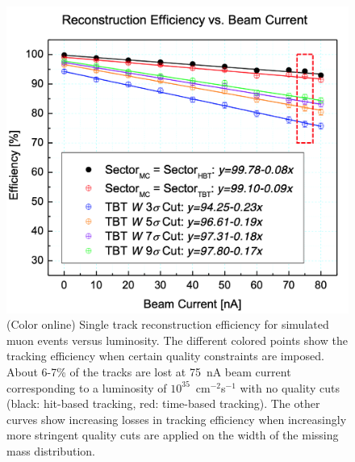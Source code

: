 \documentclass[final,3p,twocolumn]{elsarticle}
\begin{document}
\begin{figure}[htbp!]
\centerline{\includegraphics[width=1.0\columnwidth]{efficiencies.png}}
\caption{(Color online) Single track reconstruction efficiency for simulated muon events versus luminosity. 
The different colored points show the
tracking efficiency when certain quality constraints are imposed. About 6-7\% of the tracks are lost at 75~nA
beam current corresponding to a luminosity of $10^{35}$~cm$^{-2}$s$^{-1}$ with no quality cuts (black: hit-based
tracking, red: time-based tracking). The other curves show increasing losses in tracking efficiency when increasingly
more stringent quality cuts are applied on the width of the missing mass distribution.}
\label{efficiencies}
\end{figure}
\end{document}
